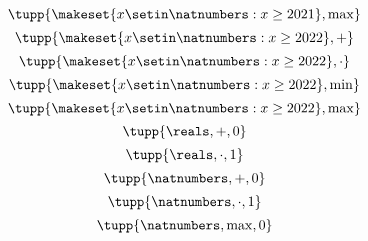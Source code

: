 {\begin{forslides}
\begin{equation}
            \tupp{ \makeset{x\setin\natnumbers: x \geq 2021 }, \max}
        \end{equation}
        \begin{equation}
            \label{eq:example-nats22-plus}
            \tupp{ \makeset{x\setin\natnumbers: x \geq 2022 }, +}
        \end{equation}
        \begin{equation}
            \label{eq:example-nats22-mult}
            \tupp{ \makeset{x\setin\natnumbers: x \geq 2022 }, \cdot}
        \end{equation}
        \begin{equation}
            \label{eq:example-nats22-min}
            \tupp{ \makeset{x\setin\natnumbers: x \geq 2022 }, \min}
        \end{equation}
        \begin{equation}
            \label{eq:example-nats22-max}
            \tupp{ \makeset{x\setin\natnumbers: x \geq 2022 }, \max}
        \end{equation}
        \begin{equation}
            \label{eq:example-monoid-reals-plus-zero}
            \tupp{\reals, {{+}}, 0}
        \end{equation}
        \begin{equation}
            \label{eq:example-monoid-reals-mult-one}
            \tupp{\reals, {{\cdot}}, 1}
        \end{equation}
        \begin{equation}
            \label{eq:example-monoid-nats-plus-zero}
            \tupp{\natnumbers, {{+}}, 0}
        \end{equation}
        \begin{equation}
            \label{eq:example-monoid-nats-mult-one}
            \tupp{\natnumbers, \cdot, 1}
        \end{equation}
        \begin{equation}
            \label{eq:example-monoid-nats-max-zero}
            \tupp{\natnumbers, \max, 0}
        \end{equation}
    \end{forslides}
}
